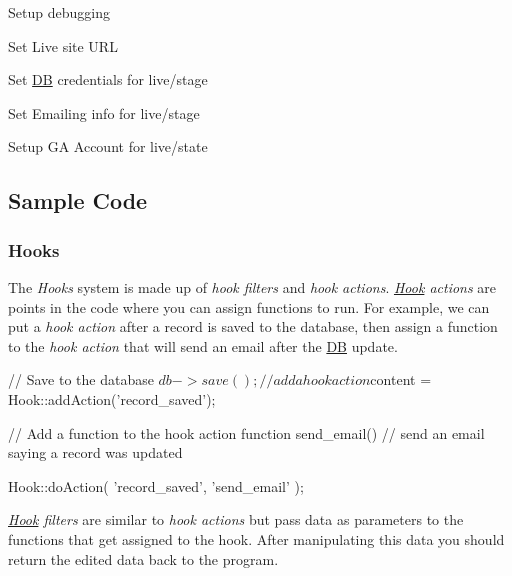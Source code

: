 \begin{DoxyItemize}
\item Setup debugging
\item Set Live site U\-R\-L
\item Set \hyperlink{class_d_b}{D\-B} credentials for live/stage
\item Set Emailing info for live/stage
\item Setup G\-A Account for live/state
\end{DoxyItemize}

\subsection*{Sample Code}

\subsubsection*{Hooks}

The {\itshape Hooks} system is made up of {\itshape hook filters} and {\itshape hook actions}. {\itshape \hyperlink{class_hook}{Hook} actions} are points in the code where you can assign functions to run. For example, we can put a {\itshape hook action} after a record is saved to the database, then assign a function to the {\itshape hook action} that will send an email after the \hyperlink{class_d_b}{D\-B} update. \begin{DoxyVerb}// Save to the database
$db->save();

// add a hook action
$content = Hook::addAction('record_saved');

// Add a function to the hook action
function send_email() {
    // send an email saying a record was updated
}

Hook::doAction(
    'record_saved',
    'send_email'
);
\end{DoxyVerb}


{\itshape \hyperlink{class_hook}{Hook} filters} are similar to {\itshape hook actions} but pass data as parameters to the functions that get assigned to the hook. After manipulating this data you should return the edited data back to the program. 


